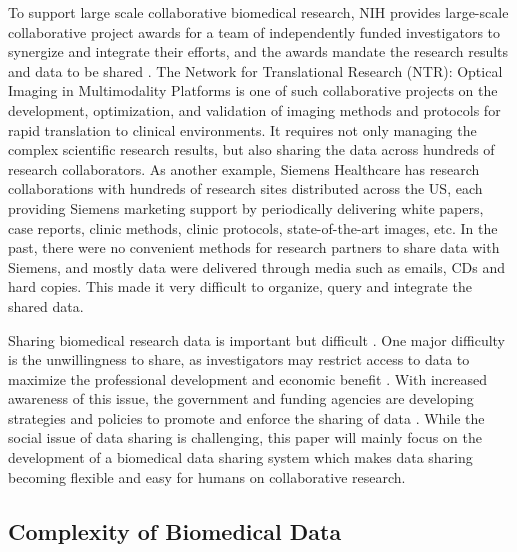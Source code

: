 \documentclass{doublecol-new}
\theoremstyle{TH}{
\newtheorem{lemma}{Lemma}
\newtheorem{theorem}[lemma]{Theorem}
\newtheorem{corrolary}[lemma]{Corrolary}
\newtheorem{conjecture}[lemma]{Conjecture}
\newtheorem{proposition}[lemma]{Proposition}
\newtheorem{claim}[lemma]{Claim}
\newtheorem{stheorem}[lemma]{Wrong Theorem}
\newtheorem{algorithm}{Algorithm}
}
\theoremstyle{THrm}{
\newtheorem{definition}{Definition}[section]
\newtheorem{question}{Question}[section]
\newtheorem{remark}{Remark}
\newtheorem{scheme}{Scheme}
}
\theoremstyle{THhit}{
\newtheorem{case}{Case}[section]
}
\begin{document}
To support large scale collaborative biomedical research, NIH
provides large-scale collaborative project awards  for a team of
independently funded investigators to synergize and integrate their
efforts, and the awards mandate the research results and data to be
shared \cite{nih03datasharing,nih08policy}.  The Network for
Translational Research (NTR): Optical Imaging in Multimodality
Platforms\cite{ntr} is one of such collaborative projects on the
development, optimization, and validation of imaging methods and
protocols for rapid translation to clinical environments.  It
requires not only managing the complex scientific research results,
but also sharing the data across hundreds of research collaborators.
As another example, Siemens Healthcare has research collaborations
with hundreds of research sites distributed across the US, each
providing Siemens marketing support by periodically delivering white
papers, case reports, clinic methods, clinic protocols,
state-of-the-art images, etc. In the past, there were no convenient
methods for research partners to share data with Siemens, and mostly
data were delivered through media such as emails, CDs and hard
copies. This made it very difficult to organize, query and integrate
the shared data.

Sharing biomedical research data is important but difficult
\cite{piwowar08culture,birnholtz03data}. One major difficulty is the
unwillingness to share, as investigators may restrict access to data
to maximize the professional development and economic benefit
\cite{bekelman03}. With increased awareness of this issue, the
government and funding agencies are developing  strategies and
policies to promote and enforce the sharing of data
\cite{piwowar08culture,dsic,cabigconnected}. While the social issue
of data sharing is challenging, this paper will mainly focus on the
development of a biomedical data sharing system which makes data
sharing becoming flexible and easy for humans on collaborative
research.

\subsection{Complexity of Biomedical Data}
\end{document}
